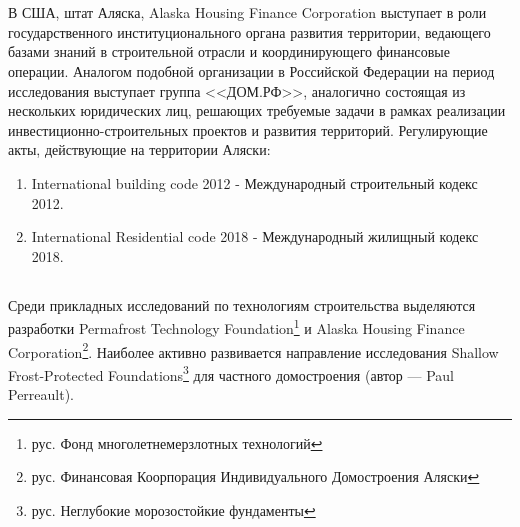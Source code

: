 \section{}





\subsection{\scAssesmentBuildingLaw}
% 
В США, штат Аляска, Alaska Housing Finance Corporation \cite{law_US_govAggregatorAlaskaHousingFinCorp} выступает в роли государственного институционального органа развития территории,
ведающего базами знаний в строительной отрасли и координирующего финансовые операции. Аналогом подобной организации в Российской Федерации на период исследования выступает группа <<ДОМ.РФ>>,
аналогично состоящая из нескольких юридических лиц, решающих требуемые задачи в рамках реализации инвестиционно-строительных проектов и развития территорий.
Регулирующие акты, действующие на территории Аляски:
\begin{enumerate}[1.]
    \item International building code 2012 - Международный строительный кодекс 2012.
    \item International Residential code 2018 - Международный жилищный кодекс 2018.
\end{enumerate}



\subsection{\scAssesmentExp}
Среди прикладных исследований по технологиям строительства выделяются разработки Permafrost Technology Foundation\footnote{рус. Фонд многолетнемерзлотных технологий} и Alaska Housing Finance Corporation\footnote{рус. Финансовая Коорпорация Индивидуального Домостроения Аляски}.
Наиболее активно развивается направление исследования Shallow Frost-Protected Foundations\footnote{рус. Неглубокие морозостойкие фундаменты} для частного домостроения (автор — Paul Perreault).
